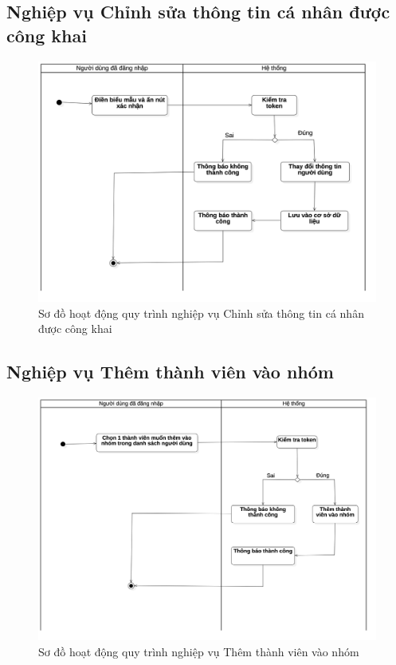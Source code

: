 \documentclass[../DoAn.tex]{subfiles}
\begin{document}
\subsection{Nghiệp vụ Chỉnh sửa thông tin cá nhân được công khai}
\begin{figure}[H]
   \centering
    \includegraphics[width=0.9\linewidth]{Hinhve/Activity/Activity_Chinh_Sua_Thong_Tin_Ca_Nhan_Duoc_Cong_Khai.png}
    \caption{Sơ đồ hoạt động quy trình nghiệp vụ Chỉnh sửa thông tin cá nhân được công khai}
    \label{fig:dang_nhap}
\end{figure}

\subsection{Nghiệp vụ Thêm thành viên vào nhóm}
\begin{figure}[H]
   \centering
    \includegraphics[width=0.9\linewidth]{Hinhve/Activity/Activity_Them_Thanh_Vien_Vao_Nhom_Chat.png}
    \caption{Sơ đồ hoạt động quy trình nghiệp vụ Thêm thành viên vào nhóm}
    \label{fig:dang_nhap}
\end{figure}
\end{document}
